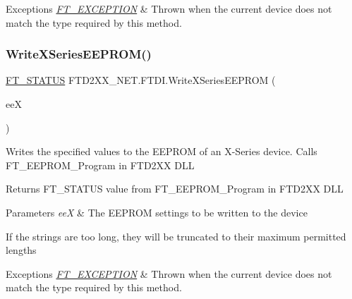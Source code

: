\begin{DoxyExceptions}{Exceptions}
{\em \mbox{\hyperlink{class_f_t_d2_x_x___n_e_t_1_1_f_t_d_i_1_1_f_t___e_x_c_e_p_t_i_o_n}{F\+T\+\_\+\+E\+X\+C\+E\+P\+T\+I\+ON}}} & Thrown when the current device does not match the type required by this method.\\
\hline
\end{DoxyExceptions}
\mbox{\label{class_f_t_d2_x_x___n_e_t_1_1_f_t_d_i_aca18d7da23f85eddf6b38ca725c6e3ac}} 
\subsubsection{\texorpdfstring{WriteXSeriesEEPROM()}{WriteXSeriesEEPROM()}}
{\footnotesize\ttfamily \mbox{\hyperlink{class_f_t_d2_x_x___n_e_t_1_1_f_t_d_i_aabe20ad905cc4ccc1e35dd5b877d9a83}{F\+T\+\_\+\+S\+T\+A\+T\+US}} F\+T\+D2\+X\+X\+\_\+\+N\+E\+T.\+F\+T\+D\+I.\+Write\+X\+Series\+E\+E\+P\+R\+OM (\begin{DoxyParamCaption}\item[{\mbox{\hyperlink{class_f_t_d2_x_x___n_e_t_1_1_f_t_d_i_1_1_f_t___x_s_e_r_i_e_s___e_e_p_r_o_m___s_t_r_u_c_t_u_r_e}{F\+T\+\_\+\+X\+S\+E\+R\+I\+E\+S\+\_\+\+E\+E\+P\+R\+O\+M\+\_\+\+S\+T\+R\+U\+C\+T\+U\+RE}}}]{eeX }\end{DoxyParamCaption})}



Writes the specified values to the E\+E\+P\+R\+OM of an X-\/\+Series device. Calls F\+T\+\_\+\+E\+E\+P\+R\+O\+M\+\_\+\+Program in F\+T\+D2\+XX D\+LL 

\begin{DoxyReturn}{Returns}
F\+T\+\_\+\+S\+T\+A\+T\+US value from F\+T\+\_\+\+E\+E\+P\+R\+O\+M\+\_\+\+Program in F\+T\+D2\+XX D\+LL
\end{DoxyReturn}

\begin{DoxyParams}{Parameters}
{\em eeX} & The E\+E\+P\+R\+OM settings to be written to the device\\
\hline
\end{DoxyParams}


If the strings are too long, they will be truncated to their maximum permitted lengths


\begin{DoxyExceptions}{Exceptions}
{\em \mbox{\hyperlink{class_f_t_d2_x_x___n_e_t_1_1_f_t_d_i_1_1_f_t___e_x_c_e_p_t_i_o_n}{F\+T\+\_\+\+E\+X\+C\+E\+P\+T\+I\+ON}}} & Thrown when the current device does not match the type required by this method.\\
\hline
\end{DoxyExceptions}


